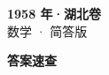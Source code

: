 \documentclass[zihao=-4, a4paper]{ctexart}
\begin{document}
\begin{center}
  {\Large\bfseries 1958 年·湖北卷}\\[4pt]
  {\large 数学 · 简答版}
\end{center}
\medskip
{}

\clearpage
{}
\begin{center}{\Large\bfseries 答案速查}\end{center}
\medskip

\end{document}
